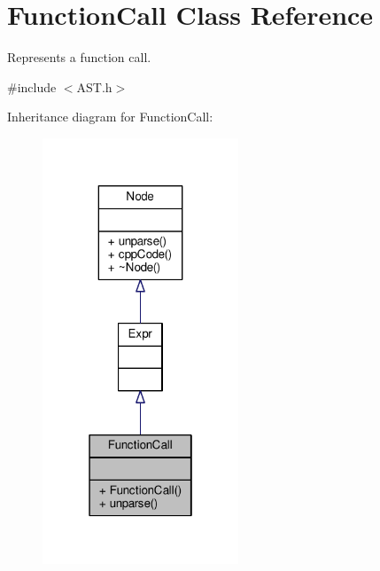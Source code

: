\hypertarget{classFunctionCall}{\section{Function\-Call Class Reference}
\label{classFunctionCall}
}


Represents a function call. \par
  




{\ttfamily \#include $<$A\-S\-T.\-h$>$}



Inheritance diagram for Function\-Call\-:\nopagebreak
\begin{figure}[H]
\begin{center}
\leavevmode
\includegraphics[width=166pt]{classFunctionCall__inherit__graph}
\end{center}
\end{figure}


